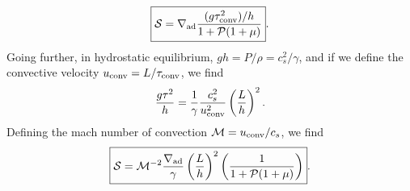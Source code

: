 \documentclass[onecolumn, amsmath, amsfonts, amssymb]{aastex62}
\newcommand{\grad}{\ensuremath{\nabla}}
\newcommand{\mS}{\ensuremath{\mathcal{S}}}
\begin{document}
\begin{enumerate}
        \begin{equation}
            \boxed{
                \mS = \grad_{\rm{ad}}\frac{ (g \tau_{\rm{conv}}^2) / h}{1 + \mathcal{P}(1 + \mu)}
            }.
        \end{equation}
        Going further, in hydrostatic equilibrium, $g h = P/\rho = c_s^2 / \gamma$, and if we define the convective velocity $u_{\rm{conv}} = L/\tau_{\rm{conv}}$, we find
        \begin{equation}
            \frac{g \tau^2}{h} = \frac{1}{\gamma}\frac{c_s^2}{u_{\rm{conv}}^2}\left(\frac{L}{h}\right)^2.
        \end{equation}
        Defining the mach number of convection $\mathcal{M} = u_{\rm{conv}}/c_s$, we find
        \begin{equation}
            \boxed{
                \mS = \mathcal{M}^{-2}\frac{\grad_{\rm{ad}}}{\gamma}\left(\frac{L}{h}\right)^2\left(\frac{1}{1 + \mathcal{P}(1 + \mu)}\right)}.
        \end{equation}
\end{enumerate}
\end{document}
